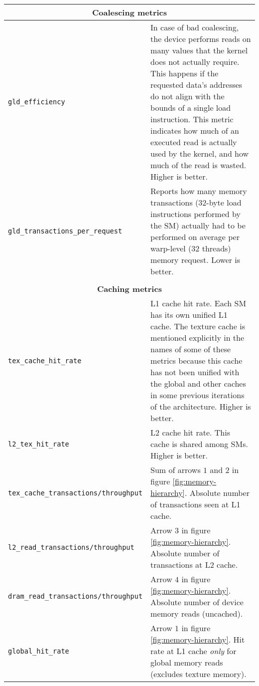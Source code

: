 \begin{longtable}{p{} p{}}
    \\
    \multicolumn{2}{c}{\textbf{Coalescing metrics}} \\
    \hline
    \hline
    \raggedright \texttt{gld\_\allowbreak efficiency} & In case of bad coalescing, the device performs reads on many values that the kernel does not actually require. This happens if the requested data's addresses do not align with the bounds of a single load instruction. This metric indicates how much of an executed read is actually used by the kernel, and how much of the read is wasted. Higher is better. \\
    \hline
    \raggedright \texttt{gld\_\allowbreak transactions\_\allowbreak per\_\allowbreak request} & Reports how many memory transactions (32-byte load instructions performed by the SM) actually had to be performed on average per warp-level (32 threads) memory request. Lower is better. \\
    
    \\
    \multicolumn{2}{c}{\textbf{Caching metrics}} \\
    \hline
    \hline
    
    \raggedright \texttt{tex\_\allowbreak cache\_\allowbreak hit\_\allowbreak rate} & L1 cache hit rate. Each SM has its own unified L1 cache. The texture cache is mentioned explicitly in the names of some of these metrics because this cache has not been unified with the global and other caches in some previous iterations of the architecture. Higher is better. \\
    \hline
    \raggedright \texttt{l2\_\allowbreak tex\_\allowbreak hit\_\allowbreak rate} & L2 cache hit rate. This cache is shared among SMs. Higher is better. \\
    \hline
    \raggedright \texttt{tex\_\allowbreak cache\_\allowbreak transactions/throughput} & Sum of arrows $1$ and $2$ in figure \ref{fig:memory-hierarchy}. Absolute number of transactions seen at L1 cache. \\
    \hline
    \raggedright \texttt{l2\_\allowbreak read\_\allowbreak transactions/throughput} & Arrow $3$ in figure \ref{fig:memory-hierarchy}. Absolute number of transactions at L2 cache. \\
    \hline
    \raggedright \texttt{dram\_\allowbreak read\_\allowbreak transactions/throughput} & Arrow $4$ in figure \ref{fig:memory-hierarchy}. Absolute number of device memory reads (uncached). \\
    \hline
    \raggedright \texttt{global\_\allowbreak hit\_\allowbreak rate} & Arrow $1$ in figure \ref{fig:memory-hierarchy}. Hit rate at L1 cache \emph{only} for global memory reads (excludes texture memory). \\
    

\end{longtable}
